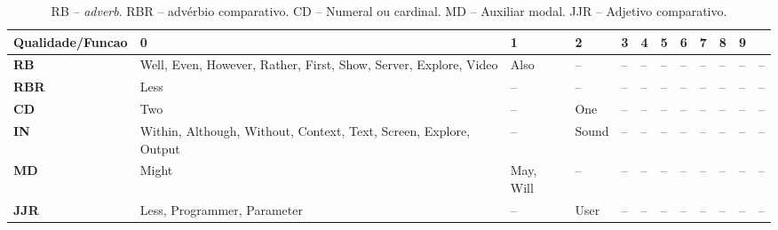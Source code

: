 \begin{table}
\centering
\caption{RB -- \emph{adverb}. RBR -- advérbio comparativo. CD -- Numeral ou cardinal. MD -- Auxiliar modal. JJR -- Adjetivo comparativo. }
\label{tab:gen5}
\small
\begin{tabular}{ | p{1cm} | p{1cm} | p{1cm} | p{1cm} | p{1cm} | p{1cm} | p{1cm} | p{1cm} | p{1cm} | p{1cm} | p{1cm} | p{1cm} |}
\hline
\hline
\tiny \textbf{Qualidade/Funcao}
 & \textbf{0}
 & \textbf{1}
 & \textbf{2}
 & \textbf{3}
 & \textbf{4}
 & \textbf{5}
 & \textbf{6}
 & \textbf{7}
 & \textbf{8}
 & \textbf{9} \\ 
\hline
\hline
 \tiny \textbf{RB} & \tiny Well, Even, However, Rather, First, Show, Server, Explore, Video  & \tiny Also  & \tiny --  & \tiny --  & \tiny --  & \tiny --  & \tiny --  & \tiny --  & \tiny --  & \tiny --  & \tiny -- \\
 \hline
\tiny \textbf{RBR}
 & \tiny Less  & \tiny --  & \tiny --  & \tiny --  & \tiny --  & \tiny --  & \tiny --  & \tiny --  & \tiny --  & \tiny --  & \tiny -- \\
 \hline
\tiny \textbf{CD}
 & \tiny Two  & \tiny --  & \tiny One  & \tiny --  & \tiny --  & \tiny --  & \tiny --  & \tiny --  & \tiny --  & \tiny --  & \tiny -- \\
 \hline
\tiny \textbf{IN}
 & \tiny Within, Although, Without, Context, Text, Screen, Explore, Output  & \tiny --  & \tiny Sound  & \tiny --  & \tiny --  & \tiny --  & \tiny --  & \tiny --  & \tiny --  & \tiny --  & \tiny -- \\
 \hline
\tiny \textbf{MD}
 & \tiny Might  & \tiny May, Will  & \tiny --  & \tiny --  & \tiny --  & \tiny --  & \tiny --  & \tiny --  & \tiny --  & \tiny --  & \tiny -- \\
 \hline
\tiny \textbf{JJR}
 & \tiny Less, Programmer, Parameter  & \tiny --  & \tiny User  & \tiny --  & \tiny --  & \tiny --  & \tiny --  & \tiny --  & \tiny --  & \tiny --  & \tiny -- \\
 \hline

\hline
\end{tabular}
\end{table}
